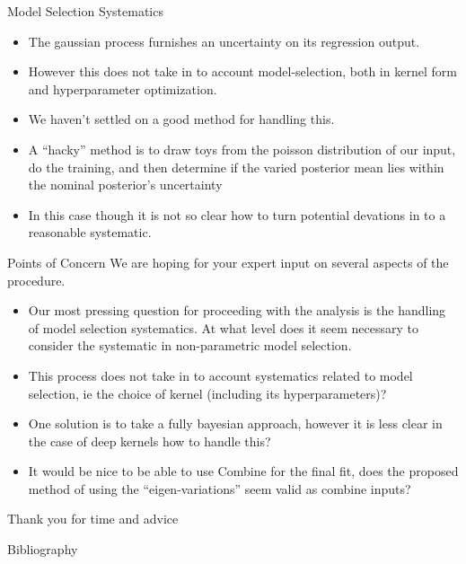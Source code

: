 \documentclass[10pt]{beamer}
\begin{document}
\begin{frame}{Model Selection Systematics}
  \begin{itemize}
  \item The gaussian process furnishes an uncertainty on its regression output.
  \item However this does not take in to account model-selection, both in kernel form and hyperparameter optimization.
  \item We haven't settled on a good method for handling this. 
  \item A ``hacky'' method is to draw toys from the poisson distribution of our input, do the training, and then determine if the varied posterior mean lies within the nominal posterior's uncertainty
  \item In this case though it is not so clear how to turn potential devations in to a reasonable systematic. 
  \end{itemize}
\end{frame}


\begin{frame}{Points of Concern}
  We are hoping for your expert input on several aspects of the procedure. 
  \begin{itemize}
  \item Our most pressing question for proceeding with the analysis is the handling of model selection systematics. At what level does it seem necessary to consider the systematic in non-parametric model selection.
  \item This process does not take in to account systematics related to model selection, ie the choice of kernel (including its hyperparameters)?
  \item One solution is to take a fully bayesian approach, however it is less clear in the case of deep kernels how to handle this? 
  \item It would be nice to be able to use Combine for the final fit, does the proposed method of using the ``eigen-variations'' seem valid as combine inputs?
  \end{itemize}
  \begin{center}
    {\Large Thank you for time and advice}
  \end{center}
\end{frame}


\begin{frame}[allowframebreaks]{Bibliography}
  
  
\end{frame}
\end{document}
